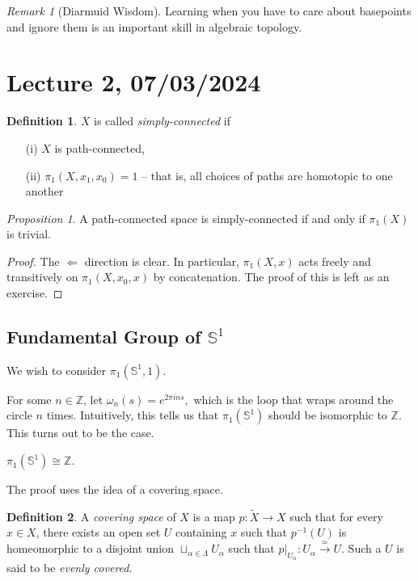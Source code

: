 \documentclass[a4paper]{report}
\theoremstyle{definition}
\newtheorem{definition}{Definition}
\theoremstyle{remark}
\newtheorem{remark}{Remark}
\theoremstyle{proposition}
\newtheorem{proposition}{Proposition}
\theoremstyle{conjecture}
\theoremstyle{lemma}
\theoremstyle{corollary}
\theoremstyle{exercise}
\begin{document}
\begin{remark}[Diarmuid Wisdom]
    Learning when you have to care about basepoints and ignore them is an 
    important skill in algebraic topology.
\end{remark}

\section{Lecture 2, 07/03/2024}

\begin{definition}
    $X$ is called \emph{simply-connected} if 
    \begin{itemize}
        \item[(i)] $X$ is path-connected,
        \item[(ii)] $\pi_1(X,x_1,x_0) = 1$ -- that is, all choices of paths are 
            homotopic to one another
    \end{itemize}
\end{definition}

\begin{proposition}
    A path-connected space is simply-connected if and only if 
    $\pi_1(X)$ is trivial.
\end{proposition}

\begin{proof}
    The $\Longleftarrow$ direction is clear. In particular, 
    $\pi_1(X,x)$ acts freely and transitively on $\pi_1(X,x_0,x)$
    by concatenation. The proof of this is left as an exercise.
\end{proof}

\subsection{Fundamental Group of $\mathbb{S}^1$}

We wish to consider $\pi_1(\mathbb{S}^1,1)$.

For some $n \in \mathbb{Z}$, let $\omega_n(s) = e^{2\pi i ns},$ which is the loop that wraps around the circle $n$ times. Intuitively, this tells us that $\pi_1(\mathbb{S}^1)$ should be isomorphic to $\mathbb{Z}$. This turns out to be the case.

\begin{theorem}\label{thm_fundgrp_circle}
    $\pi_1(\mathbb{S}^1)\cong \mathbb{Z}$.
\end{theorem}

The proof uses the idea of a covering space.

\begin{definition}
    A \emph{covering space} of $X$ is a map $p : \widetilde{X} \to X$ 
    such that for every $x \in X$, there exists an open set $U$ containing $x$ such that $p^{-1}(U)$ is homeomorphic to a disjoint union $\sqcup_{\alpha \in \Lambda} U_\alpha$ such that $p\vert_{U_\alpha} : U_\alpha \stackrel{\simeq}{\to} U$.
    Such a $U$ is said to be \emph{evenly covered}.
\end{definition}
\end{document}
